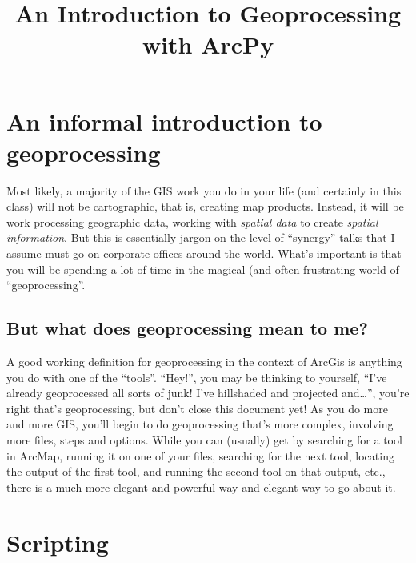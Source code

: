 \documentclass{article}
\begin{document}
\title{An Introduction to Geoprocessing with ArcPy}
\maketitle

\section{An informal introduction to geoprocessing}
Most likely, a majority of the GIS work you do in your life (and certainly in this class) will not be cartographic, that is, creating map products.  Instead, it will be work processing geographic data, working with \textit{spatial data} to create \textit{spatial information}.  But this is essentially jargon on the level of ``synergy'' talks that I assume must go on corporate offices around the world.  What's important is that you will be spending a lot of time in the magical (and often frustrating world of ``geoprocessing''.  
\subsection{But what does geoprocessing mean to me?}
A good working definition for geoprocessing in the context of ArcGis is anything you do with one of the ``tools''.  ``Hey!'', you may be thinking to yourself, ``I've already geoprocessed all sorts of junk!  I've hillshaded and projected and\dots'', you're right that's geoprocessing, but don't close this document yet!  As you do more and more GIS, you'll begin to do geoprocessing that's more complex, involving more files, steps and options.  While you can (usually) get by searching for a tool in ArcMap, running it on one of your files, searching for the next tool, locating the output of the first tool, and running the second tool on that output, etc., there is a much more elegant and powerful way and elegant way to go about it.
\section{Scripting}
\end{document}
